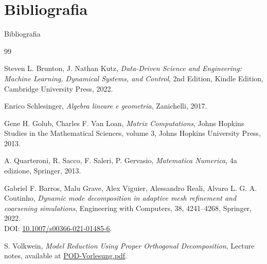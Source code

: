 \documentclass[serif]{beamer}
\begin{document}
\section{Bibliografia}
\begin{frame}{Bibliografia}
\begin{tiny}
\begin{thebibliography}{99}

\label{burton} 
Steven L. Brunton, J. Nathan Kutz, 
\textit{Data-Driven Science and Engineering: Machine Learning, Dynamical Systems, and Control}, 
2nd Edition, Kindle Edition, Cambridge University Press, 2022.

Enrico Schlesinger, 
\textit{Algebra lineare e geometria}, 
Zanichelli, 2017.

Gene H. Golub, Charles F. Van Loan,
\textit{Matrix Computations},
Johns Hopkins Studies in the Mathematical Sciences, volume 3,
Johns Hopkins University Press, 2013. 

A. Quarteroni, R. Sacco, F. Saleri, P. Gervasio, 
\textit{Matematica Numerica}, 
4a edizione, Springer, 2013.

Gabriel F. Barros, Malu Grave, Alex Viguier, Alessandro Reali, Alvaro L. G. A. Coutinho, 
\textit{Dynamic mode decomposition in adaptive mesh refinement and coarsening simulations}, 
Engineering with Computers, 38, 4241--4268, Springer, 2022. \\
DOI: \textcolor{blue}{\href{https://doi.org/10.1007/s00366-021-01485-6}{10.1007/s00366-021-01485-6}}.

\label{pod}
S. Volkwein, \textit{Model Reduction Using Proper Orthogonal Decomposition}, Lecture notes, available at \textcolor{blue}{\href{https://www.math.uni-konstanz.de/numerik/personen/volkwein/teaching/POD-Vorlesung.pdf}{POD-Vorlesung.pdf}}.

\end{thebibliography}
\end{tiny}
\end{frame}
\end{document}

